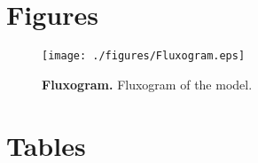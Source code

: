\documentclass[10pt]{article}
\begin{document}
\vspace{1cm}
\section*{Figures}

\begin{figure}[!ht]
\begin{center}
\texttt{[image: ./figures/Fluxogram.eps]}
\end{center}
\caption{
{\bf Fluxogram.} Fluxogram of the model.
}
\label{fig:Fluxogram}
\end{figure}


\vspace{1cm}
\section*{Tables}
\end{document}
